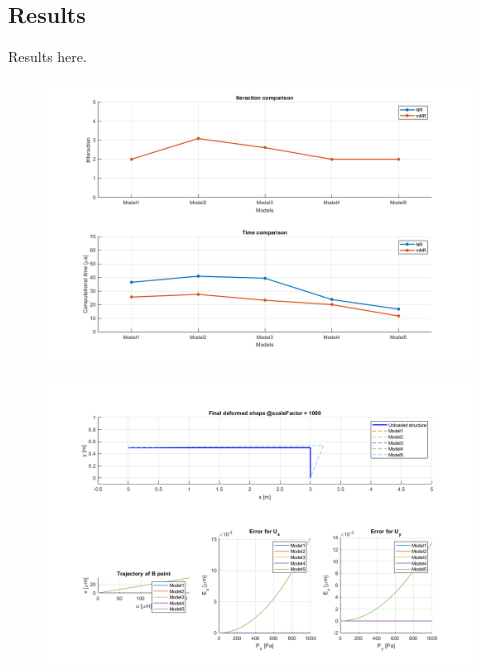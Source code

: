 \subsection{Results}

Results here.

\begin{figure}[H]
    \centering
    \label{tab:results}
\end{figure}

\begin{figure}[H]
    \centering
    \includegraphics[width=.9\textwidth]{../Results/correctors_methods_comparison}
    \label{fig:correctors_methods_comparison}
\end{figure}

\begin{figure}[H]
    \centering
    \includegraphics[width=.9\textwidth]{../Results/deformed_shape_analysis}
    \label{fig:deformed_shape_analysis}
\end{figure}